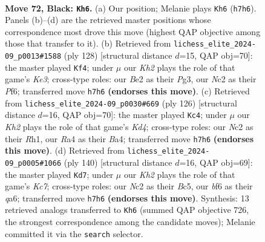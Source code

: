 \documentclass[11pt]{article}
\begin{document}
\clearpage

\begin{figure}[p]\centering
\begin{subfigure}{0.46\textwidth}\centering
\resizebox{\linewidth}{!}{%
\newchessgame
\chessboard[
  setfen={8/6Rk/5B2/8/r7/8/2n1bP1K/8 b - - 5 72},
  showmover=false,
  pgfstyle=straightmove, color=movearrow, markmove={h7-h6}
]}
\caption{}
\end{subfigure}\hfill
\begin{subfigure}{0.46\textwidth}\centering
\resizebox{\linewidth}{!}{%
\newchessgame
\chessboard[
  setfen={8/8/5P2/5R2/2k5/4K1P1/4r3/3b4 w - - 3 65},
  showmover=false,
  pgfstyle=straightmove, color=movearrow, markmove={e3-f4}
]}
\caption{}
\end{subfigure}
\\[4pt]
\begin{subfigure}{0.46\textwidth}\centering
\resizebox{\linewidth}{!}{%
\newchessgame
\chessboard[
  setfen={8/8/1k6/8/Bn1K4/3r4/8/7R w - - 13 64},
  showmover=false,
  pgfstyle=straightmove, color=movearrow, markmove={d4-c4}
]}
\caption{}
\end{subfigure}\hfill
\begin{subfigure}{0.46\textwidth}\centering
\resizebox{\linewidth}{!}{%
\newchessgame
\chessboard[
  setfen={2r5/2K5/q7/2B2k2/8/6p1/8/8 w - - 2 71},
  showmover=false,
  pgfstyle=straightmove, color=movearrow, markmove={c7-d7}
]}
\caption{}
\end{subfigure}
\caption{\textbf{Move 72, Black: \texttt{Kh6}.} (a) Our position; Melanie plays \texttt{Kh6} (\texttt{h7h6}). Panels (b)--(d) are the retrieved master positions whose correspondence most drove this move (highest QAP objective among those that transfer to it). (b) Retrieved from \texttt{lichess\_elite\_2024-09\_p0013\#1588} (ply 128) [structural distance $d$=15, QAP obj=70]: the master played \texttt{Kf4}; under $\mu$ our \emph{Kh2} plays the role of that game's \emph{Ke3}; cross-type roles: our \emph{B}e2 as their \emph{P}g3, our \emph{N}c2 as their \emph{P}f6; transferred move \texttt{h7h6} \textbf{(endorses this move)}. (c) Retrieved from \texttt{lichess\_elite\_2024-09\_p0030\#669} (ply 126) [structural distance $d$=16, QAP obj=70]: the master played \texttt{Kc4}; under $\mu$ our \emph{Kh2} plays the role of that game's \emph{Kd4}; cross-type roles: our \emph{N}c2 as their \emph{R}h1, our \emph{R}a4 as their \emph{B}a4; transferred move \texttt{h7h6} \textbf{(endorses this move)}. (d) Retrieved from \texttt{lichess\_elite\_2024-09\_p0005\#1066} (ply 140) [structural distance $d$=16, QAP obj=69]: the master played \texttt{Kd7}; under $\mu$ our \emph{Kh2} plays the role of that game's \emph{Kc7}; cross-type roles: our \emph{N}c2 as their \emph{B}c5, our \emph{b}f6 as their \emph{q}a6; transferred move \texttt{h7h6} \textbf{(endorses this move)}. Synthesis: 13 retrieved analogs transferred to \texttt{Kh6} (summed QAP objective 726, the strongest correspondence among the candidate moves); Melanie committed it via the \texttt{search} selector.}
\label{fig:thought-m143}
\end{figure}
\end{document}
